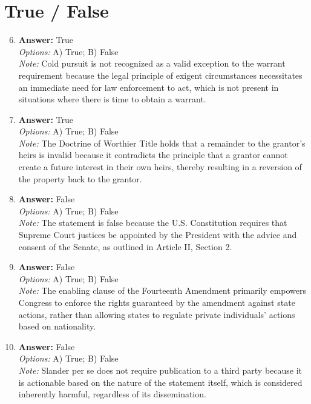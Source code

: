 \documentclass[12pt]{article}
\begin{document}
\section*{True / False}
\begin{enumerate}[label=\arabic*.]
\setcounter{enumi}{5}
\item \textbf{Answer:} True
\\ \textit{Options:} A) True; B) False
\\ \textit{Note:} Cold pursuit is not recognized as a valid exception to the warrant requirement because the legal principle of exigent circumstances necessitates an immediate need for law enforcement to act, which is not present in situations where there is time to obtain a warrant.
\item \textbf{Answer:} True
\\ \textit{Options:} A) True; B) False
\\ \textit{Note:} The Doctrine of Worthier Title holds that a remainder to the grantor's heirs is invalid because it contradicts the principle that a grantor cannot create a future interest in their own heirs, thereby resulting in a reversion of the property back to the grantor.
\item \textbf{Answer:} False
\\ \textit{Options:} A) True; B) False
\\ \textit{Note:} The statement is false because the U.S. Constitution requires that Supreme Court justices be appointed by the President with the advice and consent of the Senate, as outlined in Article II, Section 2.
\item \textbf{Answer:} False
\\ \textit{Options:} A) True; B) False
\\ \textit{Note:} The enabling clause of the Fourteenth Amendment primarily empowers Congress to enforce the rights guaranteed by the amendment against state actions, rather than allowing states to regulate private individuals' actions based on nationality.
\item \textbf{Answer:} False
\\ \textit{Options:} A) True; B) False
\\ \textit{Note:} Slander per se does not require publication to a third party because it is actionable based on the nature of the statement itself, which is considered inherently harmful, regardless of its dissemination.
\end{enumerate}
\end{document}
